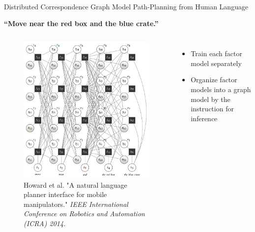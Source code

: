 \begin{frame}{Distributed Correspondence Graph}{ Model Path-Planning from Human Language }
	
{\bf ``Move near the red box and the blue crate.''}
	
\begin{columns}
\begin{figure}
	\centering
	\includegraphics[width=.9\linewidth]{figure/DCG}
	\caption{ \tiny{ Howard et al. "A natural language planner interface for mobile manipulators." {\it IEEE International Conference on Robotics and Automation (ICRA) 2014.} } }
\end{figure}
\begin{itemize}
\item Train each factor model separately
\item Organize factor models into a graph model by the instruction for inference
\end{itemize}
\end{columns}

\end{frame}	

